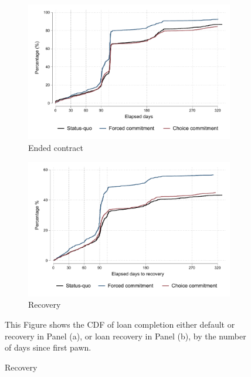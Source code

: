 \begin{figure}[H]
        \caption{Survival graph}
        \vspace{-2em}
    \label{survival_graph}
    \begin{center}
   \begin{subfigure}{0.49\textwidth}
   \caption{Ended contract}
        \centering
        \includegraphics[width=\textwidth]{Figuras/survival_graph_ended.pdf}
    \end{subfigure} 
   \begin{subfigure}{0.49\textwidth}
   \caption{Recovery}
        \centering
        \includegraphics[width=\textwidth]{Figuras/survival_graph_unpledge.pdf}
    \end{subfigure}     
    \end{center}
    \vspace{-1em}
     \scriptsize  This Figure shows the CDF of loan completion either default or recovery in Panel (a), or loan recovery in Panel (b), by the number of days since first pawn.
\end{figure}

